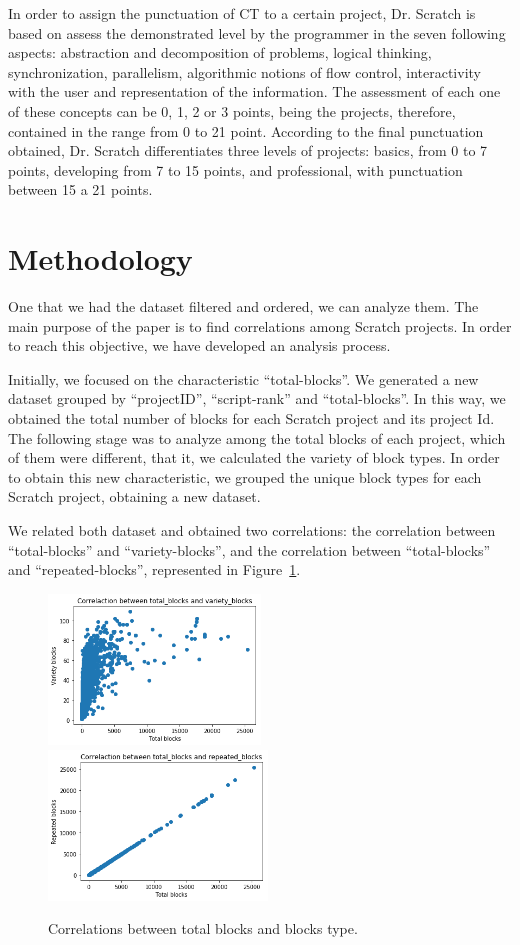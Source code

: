 \documentclass[a4paper,twocolumn,10pt]{article}
\begin{document}
In order to assign the punctuation of CT to a certain project, Dr. Scratch
is based on assess the demonstrated level by the programmer in the seven
following aspects: abstraction and decomposition of problems, logical
thinking, synchronization, parallelism, algorithmic notions of flow control, 
interactivity with the user and representation of the information. The 
assessment of each one of these concepts can be 0, 1, 2 or 3 points, being
the projects, therefore, contained in the range from 0 to 21 point. According
to the final punctuation obtained, Dr. Scratch differentiates three levels of
projects: basics, from 0 to 7 points, developing from 7 to 15 points, and
professional, with punctuation between 15 a 21 points.

\section{Methodology}
\label{sec:methodology}

One that we had the dataset filtered and ordered, we can analyze them.
The main purpose of the paper is to find correlations among Scratch
projects. In order to reach this objective, we have developed an analysis
process.

Initially, we focused on the characteristic ``total-blocks''. We generated a new
dataset grouped by ``projectID'', ``script-rank'' and ``total-blocks''. In this way,
we obtained the total number of blocks for each Scratch project and its project
Id. The following stage was to analyze among the total blocks of each project, 
which of them were different, that it, we calculated the variety of block types. 
In order to obtain this new characteristic, we grouped the unique block types for
each Scratch project, obtaining a new dataset.

We related both dataset and obtained two correlations: the correlation between
``total-blocks'' and ``variety-blocks'', and the correlation between ``total-blocks''
and ``repeated-blocks'', represented in Figure~\ref{tab:corr_1}.


\begin{figure}
\includegraphics[height=4cm]{images/1.png}
\includegraphics[height=4cm]{images/2.png}
\caption{Correlations between total blocks and blocks type.}
\label{tab:corr_1}
\end{figure}
\end{document}
